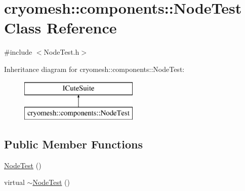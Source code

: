\hypertarget{classcryomesh_1_1components_1_1_node_test}{
\section{cryomesh::components::NodeTest Class Reference}
\label{classcryomesh_1_1components_1_1_node_test}
}


{\ttfamily \#include $<$NodeTest.h$>$}

Inheritance diagram for cryomesh::components::NodeTest:\begin{figure}[H]
\begin{center}
\leavevmode
\includegraphics[height=2.000000cm]{classcryomesh_1_1components_1_1_node_test}
\end{center}
\end{figure}
\subsection*{Public Member Functions}
\begin{DoxyCompactItemize}
\item 
\hyperlink{classcryomesh_1_1components_1_1_node_test_ae8bb3c72288306e666d18696a5be7b35}{NodeTest} ()
\item 
virtual \hyperlink{classcryomesh_1_1components_1_1_node_test_a6a346d4f8e13c5aaa6b030b0587bcff9}{$\sim$NodeTest} ()
\end{DoxyCompactItemize}

